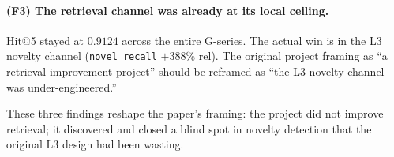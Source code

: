 \paragraph{(F3) The retrieval channel was already at its local ceiling.} Hit@5 stayed at $0.9124$ across the entire G-series. The actual win is in the L3 novelty channel (\texttt{novel\_recall} $+388\%$ rel). The original project framing as ``a retrieval improvement project'' should be reframed as ``the L3 novelty channel was under-engineered.''

These three findings reshape the paper's framing: the project did not improve retrieval; it discovered and closed a blind spot in novelty detection that the original L3 design had been wasting.
